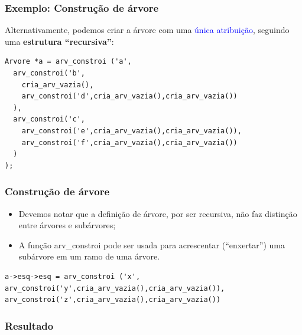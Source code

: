 \documentclass{beamer}
\newcommand{\tcb}[1]{\textcolor{blue}{#1}}
\begin{document}
\begin{frame}[fragile]
  \frametitle{Exemplo: Construção de árvore}

  Alternativamente, podemos criar a árvore com uma \tcb{única atribuição}, seguindo uma
  \textbf{estrutura ``recursiva''}:

  \begin{verbatim}
Arvore *a = arv_constroi ('a',
  arv_constroi('b',
    cria_arv_vazia(),
    arv_constroi('d',cria_arv_vazia(),cria_arv_vazia())
  ),
  arv_constroi('c',
    arv_constroi('e',cria_arv_vazia(),cria_arv_vazia()),
    arv_constroi('f',cria_arv_vazia(),cria_arv_vazia())
  )
);
  \end{verbatim}
\end{frame}

\begin{frame}[fragile]
  \frametitle{Construção de árvore}

  \begin{itemize}
    \item Devemos notar que a definição de árvore, por ser recursiva, não faz distinção 
          entre árvores e subárvores;
    \item A função arv\_constroi pode ser usada para acrescentar (``enxertar'') uma subárvore 
          em um ramo de uma árvore.
  \end{itemize}

  \begin{verbatim}
a->esq->esq = arv_constroi ('x',
arv_constroi('y',cria_arv_vazia(),cria_arv_vazia()),
arv_constroi('z',cria_arv_vazia(),cria_arv_vazia())
  \end{verbatim}
\end{frame}

\begin{frame}[c]
  \frametitle{Resultado}

  \centering

\end{frame}
\end{document}
